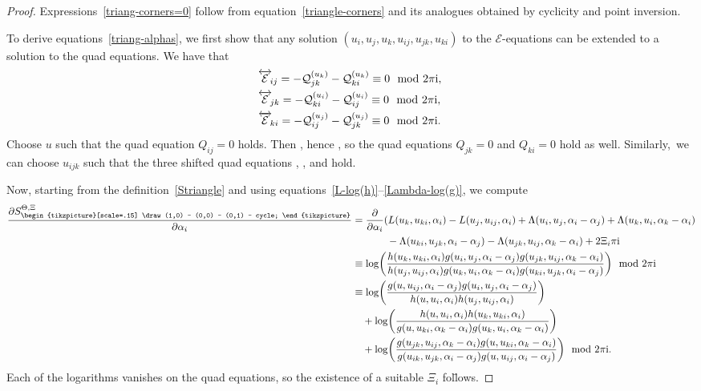 \documentclass[10pt,a4paper]{amsart}
\newcommand{\inversion}[1]{\!\overleftrightarrow{\,#1\,}\!}
\newcommand{\triang}{{\begin{tikzpicture}[scale=.15]
			\draw (1,0) -- (0,0) -- (0,1) -- cycle;
\end{tikzpicture}}}
\newcommand{\pdv}[2]{\frac{\partial {#1}}{\partial {#2}}}
\numberwithin{equation}{section}
\begin{document}
\begin{proof}
 Expressions~\eqref{triang-corners=0} follow from equation~\eqref{triangle-corners} and its analogues obtained by cyclicity and point inversion.

 To derive equations~\eqref{triang-alphas}, we first show that any solution $(u_i,u_j,u_k,u_{ij},u_{jk},u_{ki})$ to the $\mathcal{E}$-equations can be extended to a solution to the quad equations. We have that
 \begin{align*}
 & \inversion{\mathcal{E}}_{ij} = -\mathcal{Q}^{(u_k)}_{jk} - \mathcal{Q}^{(u_k)}_{ki} \equiv 0 \mod 2 \pi {\rm i} , \\
 & \inversion{\mathcal{E}}_{jk} = -\mathcal{Q}^{(u_i)}_{ki} - \mathcal{Q}^{(u_i)}_{ij} \equiv 0 \mod 2 \pi {\rm i} , \\
 & \inversion{\mathcal{E}}_{ki} = -\mathcal{Q}^{(u_j)}_{ij} - \mathcal{Q}^{(u_j)}_{jk} \equiv 0 \mod 2 \pi {\rm i} .
 \end{align*}
 Choose $u$ such that the quad equation $Q_{ij} = 0$ holds. Then , hence , so the quad equations $Q_{jk} = 0$ and $Q_{ki} = 0$ hold as well. Similarly,~we can choose $u_{ijk}$ such that the three shifted quad equations \smash{$\inversion{Q}_{ij} = 0$}, \smash{$\inversion{Q}_{jk} = 0$}, and \smash{$\inversion{Q}_{ki} = 0$} hold.

\allowdisplaybreaks Now, starting from the definition~\eqref{Striangle} and using equations~\eqref{L-log(h)}--\eqref{Lambda-log(g)}, we compute
 \begin{align*}
	\pdv{S^{\Theta,\Xi}_\triang}{\alpha_i} &=
	\pdv{}{\alpha_i} ( L(u_k,u_{ki},\alpha_i) - L(u_j,u_{ij},\alpha_i) + \Lambda(u_i,u_{j},\alpha_i-\alpha_j) + \Lambda(u_k,u_{i},\alpha_k-\alpha_i)\\
	&\hphantom{=\pdv{}{\alpha_i} ( }{}\, - \Lambda(u_{ki}, u_{jk}, \alpha_i-\alpha_j) - \Lambda(u_{jk},u_{ij},\alpha_k-\alpha_i ) + 2 \Xi_i \pi {\rm i} \\
	&\equiv \log\biggl( \frac{h(u_k,u_{ki},\alpha_i)g(u_i,u_{j},\alpha_i-\alpha_j)g(u_{jk},u_{ij},\alpha_k-\alpha_i)}{h(u_j,u_{ij},\alpha_i)g(u_k,u_{i},\alpha_k-\alpha_i)g(u_{ki}, u_{jk}, \alpha_i-\alpha_j)} \biggr) \mod 2 \pi {\rm i} \\
	&\equiv \log\biggl( \frac{g(u, u_{ij}, \alpha_i-\alpha_j) g(u_i,u_j,\alpha_i-\alpha_j)}{h(u,u_{i},\alpha_i)h(u_j,u_{ij},\alpha_i)} \biggr) \\
	& \quad + \log\biggl( \frac{h(u,u_{i},\alpha_i)h(u_k,u_{ki},\alpha_i)}{g(u, u_{ki}, \alpha_k-\alpha_i)g(u_k,u_i,\alpha_k-\alpha_i)} \biggr) \\
	& \quad + \log\biggl( \frac{g(u_{jk},u_{ij},\alpha_k-\alpha_i)g(u,u_{ki},\alpha_k-\alpha_i)}{g(u_{ik},u_{jk},\alpha_i-\alpha_j)g(u,u_{ij},\alpha_i-\alpha_j) } \biggr) \mod 2 \pi {\rm i} .
\end{align*}
Each of the logarithms vanishes on the quad equations, so the existence of a suitable $\Xi_i$ fol\=lows.
\end{proof}
\end{document}
